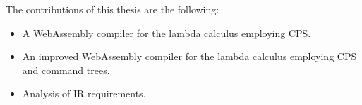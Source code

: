 The contributions of this thesis are the following:
\begin{itemize}
\item A WebAssembly compiler for the lambda calculus employing CPS.
\item An improved WebAssembly compiler for the lambda calculus employing CPS and command trees.
\item Analysis of \ac{IR} requirements.
\end{itemize}